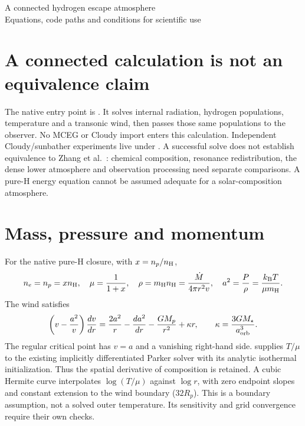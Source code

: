 \documentclass[10pt,a4paper]{article}
\newcommand{\kb}{k_{\mathrm B}}
\newcommand{\mh}{m_{\mathrm H}}
\begin{document}
\begin{center}
{\Large A connected hydrogen escape atmosphere}\\[4pt]
Equations, code paths and conditions for scientific use
\end{center}

\section{A connected calculation is not an equivalence claim}
The native entry point is
.
It solves internal radiation, hydrogen populations, temperature and a
transonic wind, then passes those same populations to the observer.
No MCEG or Cloudy import enters this calculation.
Independent Cloudy/sunbather experiments live under .
A successful solve does not establish equivalence to Zhang et al.~\cite{zhang}:
chemical composition, resonance redistribution, the dense lower atmosphere
and observation processing need separate comparisons. A pure-H energy equation
cannot be assumed adequate for a solar-composition atmosphere.

\section{Mass, pressure and momentum}
For the native pure-H closure, with $x=n_p/n_{\rm H}$,
\begin{equation}
 n_e=n_p=x n_{\rm H},\quad \mu=\frac{1}{1+x},\quad
 \rho=\mh n_{\rm H}=\frac{\dot M}{4\pi r^2v},\quad
 a^2=\frac{P}{\rho}=\frac{\kb T}{\mu\mh}.
 \label{eq:mass}
\end{equation}
The wind satisfies
\begin{equation}
 \left(v-\frac{a^2}{v}\right)\frac{dv}{dr}
 =\frac{2a^2}{r}-\frac{da^2}{dr}-\frac{GM_p}{r^2}+\kappa r,
 \qquad \kappa=\frac{3GM_\star}{a_{\rm orb}^3}.
 \label{eq:wind}
\end{equation}
The regular critical point has $v=a$ and a vanishing right-hand side.
 supplies $T/\mu$ to the existing
implicitly differentiated Parker solver with its analytic isothermal
initialization. Thus the spatial derivative of composition is retained.
A cubic Hermite curve interpolates $\log(T/\mu)$ against $\log r$,
with zero endpoint slopes and constant extension to the wind boundary
($32R_p$). This is a boundary assumption, not a solved outer temperature.
Its sensitivity and grid convergence require their own checks.
\end{document}
